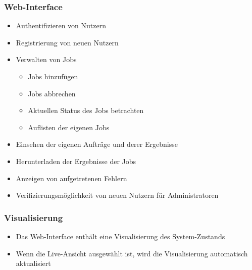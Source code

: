     \subsubsection{Web-Interface}
        \begin{itemize}
            \item Authentifizieren von Nutzern
            \item Registrierung von neuen Nutzern
            \item Verwalten von Jobs
                 \begin{itemize}
                    \item Jobs hinzufügen
                    \item Jobs abbrechen
                    \item Aktuellen Status des Jobs betrachten
                    \item Auflisten der eigenen Jobs
                \end{itemize}
            \item Einsehen der eigenen Aufträge und derer Ergebnisse
            \item Herunterladen der Ergebnisse der Jobs
            \item Anzeigen von aufgetretenen Fehlern
            \item Verifizierungsmöglichkeit von neuen Nutzern für Administratoren 
            
                      
        \end{itemize}
    \subsubsection{Visualisierung}    
        \begin{itemize}
            \item Das Web-Interface enthält eine Visualisierung des System-Zustands
            \item Wenn die Live-Ansicht ausgewählt ist, wird die Visualisierung automatisch aktualisiert
        \end{itemize}
    

